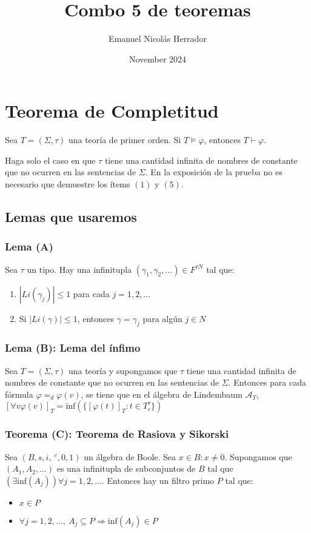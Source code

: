 \documentclass{article}
\title{Combo 5 de teoremas}
\author{Emanuel Nicolás Herrador}
\date{November 2024}
\begin{document}
\maketitle

\section*{Teorema de Completitud}
Sea $T=(\Sigma,\tau)$ una teoría de primer orden. Si $T\vDash\varphi$, entonces $T\vdash\varphi$.

Haga solo el caso en que $\tau$ tiene una cantidad infinita de nombres de constante que no ocurren en las sentencias de $\Sigma$. En la exposición de la prueba no es necesario que demuestre los ítems $(1)$ y $(5)$.

\subsection*{Lemas que usaremos}
\subsubsection*{Lema (A)}
Sea $\tau$ un tipo. Hay una infinitupla $(\gamma_1,\gamma_2,\dots)\in F^{\tau N}$ tal que:
\begin{enumerate}
  \item $|Li(\gamma_j)|\leq 1$ para cada $j=1,2,\dots$
  \item Si $|Li(\gamma)|\leq 1$, entonces $\gamma=\gamma_j$ para algún $j\in N$
\end{enumerate}

\subsubsection*{Lema (B): Lema del ínfimo}
Sea $T=(\Sigma,\tau)$ una teoría y supongamos que $\tau$ tiene una cantidad infinita de nombres de constante que no ocurren en las sentencias de $\Sigma$. Entonces para cada fórmula $\varphi=_d\varphi(v)$, se tiene que en el álgebra de Lindembaum $\mathcal{A}_T$, $[\forall v\varphi(v)]_T=\text{inf}(\{[\varphi(t)]_T:t\in T^\tau_c\})$

\subsubsection*{Teorema (C): Teorema de Rasiova y Sikorski}
Sea $(B,s,i,\ ^c,0,1)$ un álgebra de Boole. Sea $x\in B:x\neq 0$. Supongamos que $(A_1,A_2,\dots)$ es una infinitupla de subconjuntos de $B$ tal que $(\exists\text{inf}(A_j))\forall j=1,2,\dots$. Entonces hay un filtro primo $P$ tal que:
\begin{itemize}
  \item $x\in P$
  \item $\forall j=1,2,\dots,\ A_j\subseteq P\Rightarrow\text{inf}(A_j)\in P$
\end{itemize}
\end{document}
